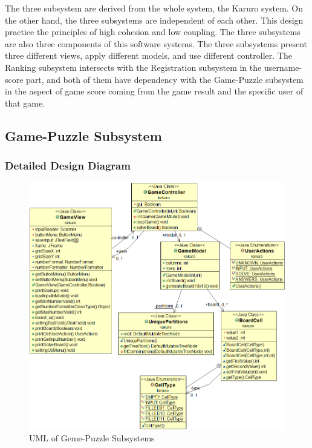 \documentclass[12pt]{article}
\begin{document}
The three subsystem are derived from the whole system, the Karuro system. On the other hand, the three subsystems are independent of each other. This design practice the principles of high cohesion and low coupling. The three subsystems are also three components of this software systems. The three subsystems present three different views, apply different models, and use different controller. The Ranking subsystem intersects with the Registration subsystem in the username-score part, and both of them have dependency with the Game-Puzzle subsystem in the aspect of game score coming from the game result and the specific user of that game.



\newpage

\subsection{Game-Puzzle Subsystem}

\subsubsection{Detailed Design Diagram}

\begin{figure}[htbp]
    \includegraphics[width=1\textwidth]{GamePuzzle_UML}
    \caption{UML of Geme-Puzzle Subsystems}
    \label{fig:GamePuzzle_UML}
\end{figure}
\end{document}
